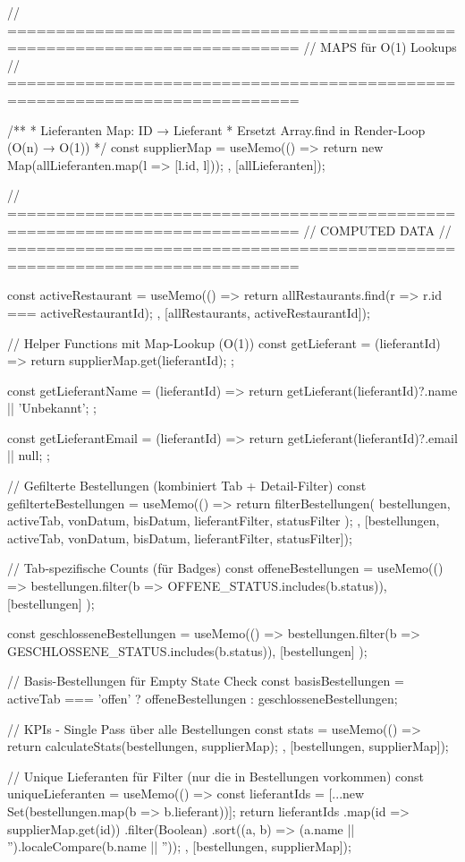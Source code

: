 {  // ============================================================================
  // MAPS für O(1) Lookups
  // ============================================================================

  /**
   * Lieferanten Map: ID → Lieferant
   * Ersetzt Array.find in Render-Loop (O(n) → O(1))
   */
  const supplierMap = useMemo(() => {
    return new Map(allLieferanten.map(l => [l.id, l]));
  }, [allLieferanten]);

  // ============================================================================
  // COMPUTED DATA
  // ============================================================================

  const activeRestaurant = useMemo(() => {
    return allRestaurants.find(r => r.id === activeRestaurantId);
  }, [allRestaurants, activeRestaurantId]);

  // Helper Functions mit Map-Lookup (O(1))
  const getLieferant = (lieferantId) => {
    return supplierMap.get(lieferantId);
  };

  const getLieferantName = (lieferantId) => {
    return getLieferant(lieferantId)?.name || 'Unbekannt';
  };

  const getLieferantEmail = (lieferantId) => {
    return getLieferant(lieferantId)?.email || null;
  };

  // Gefilterte Bestellungen (kombiniert Tab + Detail-Filter)
  const gefilterteBestellungen = useMemo(() => {
    return filterBestellungen({
      bestellungen,
      activeTab,
      vonDatum,
      bisDatum,
      lieferantFilter,
      statusFilter
    });
  }, [bestellungen, activeTab, vonDatum, bisDatum, lieferantFilter, statusFilter]);

  // Tab-spezifische Counts (für Badges)
  const offeneBestellungen = useMemo(() => 
    bestellungen.filter(b => OFFENE_STATUS.includes(b.status)), 
    [bestellungen]
  );

  const geschlosseneBestellungen = useMemo(() => 
    bestellungen.filter(b => GESCHLOSSENE_STATUS.includes(b.status)), 
    [bestellungen]
  );

  // Basis-Bestellungen für Empty State Check
  const basisBestellungen = activeTab === 'offen' ? offeneBestellungen : geschlosseneBestellungen;

  // KPIs - Single Pass über alle Bestellungen
  const stats = useMemo(() => {
    return calculateStats(bestellungen, supplierMap);
  }, [bestellungen, supplierMap]);

  // Unique Lieferanten für Filter (nur die in Bestellungen vorkommen)
  const uniqueLieferanten = useMemo(() => {
    const lieferantIds = [...new Set(bestellungen.map(b => b.lieferant))];
    return lieferantIds
      .map(id => supplierMap.get(id))
      .filter(Boolean)
      .sort((a, b) => (a.name || '').localeCompare(b.name || ''));
  }, [bestellungen, supplierMap]);

}
